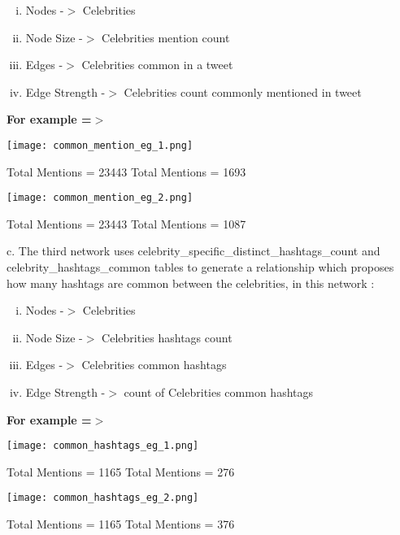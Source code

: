 \documentclass[runningheads,a4paper]{llncs}
\begin{document}
\begin{itemize}
\begin{enumerate}[i.  ]
\addtolength{\itemindent}{1cm}
\item Nodes -$>$ Celebrities
\item Node Size -$>$ Celebrities mention count
\item Edges -$>$ Celebrities common in a tweet
\item Edge Strength -$>$ Celebrities count commonly mentioned in tweet
\end{enumerate}
\vspace{0.1in}
\textbf{For example =$>$}
\begin{flushleft}
\centerline{\texttt{[image: common\_mention\_eg\_1.png]}}
\centerline{Total Mentions = 23443 \hspace{2cm} Total Mentions = 1693}
\vspace{0.2in}
\centerline{\texttt{[image: common\_mention\_eg\_2.png]}}
\centerline{Total Mentions = 23443 \hspace{2cm} Total Mentions = 1087}
\end{flushleft}
\subitem c. The third network uses celebrity\_specific\_distinct\_hashtags\_count and celebrity\_hashtags\_common tables to generate a relationship which proposes how many hashtags are common between the celebrities, in this network :
\vspace{0.1in}
\begin{enumerate}[i.  ]
\addtolength{\itemindent}{1cm}
\item Nodes -$>$ Celebrities
\item Node Size -$>$ Celebrities hashtags count
\item Edges -$>$ Celebrities common hashtags
\item Edge Strength -$>$ count of Celebrities common hashtags
\end{enumerate}
\vspace{0.1in}
\textbf{For example =$>$}
\begin{flushleft}
\centerline{\texttt{[image: common\_hashtags\_eg\_1.png]}}
\centerline{Total Mentions = 1165 \hspace{2cm} Total Mentions = 276}
\vspace{0.2in}
\centerline{\texttt{[image: common\_hashtags\_eg\_2.png]}}
\centerline{Total Mentions = 1165 \hspace{2cm} Total Mentions = 376}
\end{flushleft}
\end{itemize}
\end{document}
